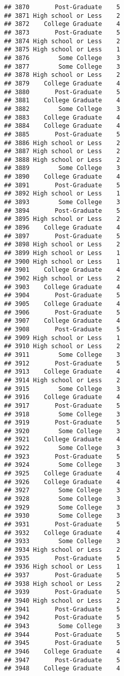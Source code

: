 \documentclass[
]{article}
\begin{document}
\begin{verbatim}
## 3870       Post-Graduate    5
## 3871 High school or Less    2
## 3872    College Graduate    4
## 3873       Post-Graduate    5
## 3874 High school or Less    2
## 3875 High school or Less    1
## 3876        Some College    3
## 3877        Some College    3
## 3878 High school or Less    2
## 3879    College Graduate    4
## 3880       Post-Graduate    5
## 3881    College Graduate    4
## 3882        Some College    3
## 3883    College Graduate    4
## 3884    College Graduate    4
## 3885       Post-Graduate    5
## 3886 High school or Less    2
## 3887 High school or Less    2
## 3888 High school or Less    2
## 3889        Some College    3
## 3890    College Graduate    4
## 3891       Post-Graduate    5
## 3892 High school or Less    1
## 3893        Some College    3
## 3894       Post-Graduate    5
## 3895 High school or Less    2
## 3896    College Graduate    4
## 3897       Post-Graduate    5
## 3898 High school or Less    2
## 3899 High school or Less    1
## 3900 High school or Less    1
## 3901    College Graduate    4
## 3902 High school or Less    2
## 3903    College Graduate    4
## 3904       Post-Graduate    5
## 3905    College Graduate    4
## 3906       Post-Graduate    5
## 3907    College Graduate    4
## 3908       Post-Graduate    5
## 3909 High school or Less    1
## 3910 High school or Less    2
## 3911        Some College    3
## 3912       Post-Graduate    5
## 3913    College Graduate    4
## 3914 High school or Less    2
## 3915        Some College    3
## 3916    College Graduate    4
## 3917       Post-Graduate    5
## 3918        Some College    3
## 3919       Post-Graduate    5
## 3920        Some College    3
## 3921    College Graduate    4
## 3922        Some College    3
## 3923       Post-Graduate    5
## 3924        Some College    3
## 3925    College Graduate    4
## 3926    College Graduate    4
## 3927        Some College    3
## 3928        Some College    3
## 3929        Some College    3
## 3930        Some College    3
## 3931       Post-Graduate    5
## 3932    College Graduate    4
## 3933        Some College    3
## 3934 High school or Less    2
## 3935       Post-Graduate    5
## 3936 High school or Less    1
## 3937       Post-Graduate    5
## 3938 High school or Less    2
## 3939       Post-Graduate    5
## 3940 High school or Less    2
## 3941       Post-Graduate    5
## 3942       Post-Graduate    5
## 3943        Some College    3
## 3944       Post-Graduate    5
## 3945       Post-Graduate    5
## 3946    College Graduate    4
## 3947       Post-Graduate    5
## 3948    College Graduate    4

\end{verbatim}
\end{document}
